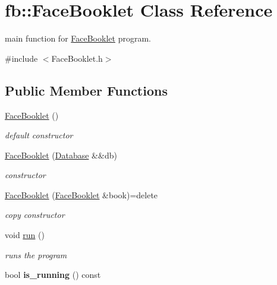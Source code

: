 \hypertarget{classfb_1_1_face_booklet}{\section{fb\+:\+:Face\+Booklet Class Reference}
\label{classfb_1_1_face_booklet}
}


main function for \hyperlink{classfb_1_1_face_booklet}{Face\+Booklet} program.  




{\ttfamily \#include $<$Face\+Booklet.\+h$>$}

\subsection*{Public Member Functions}
\begin{DoxyCompactItemize}
\item 
\hypertarget{classfb_1_1_face_booklet_ab8c98ceebb70c063a3f2f26247fddfdf}{\hyperlink{classfb_1_1_face_booklet_ab8c98ceebb70c063a3f2f26247fddfdf}{Face\+Booklet} ()}\label{classfb_1_1_face_booklet_ab8c98ceebb70c063a3f2f26247fddfdf}

\begin{DoxyCompactList}\small\item\em default constructor \end{DoxyCompactList}\item 
\hyperlink{classfb_1_1_face_booklet_a2a3a9acd18e96c53a7d2cb1ce83dd092}{Face\+Booklet} (\hyperlink{classfb_1_1_database}{Database} \&\&db)
\begin{DoxyCompactList}\small\item\em constructor \end{DoxyCompactList}\item 
\hypertarget{classfb_1_1_face_booklet_a39051b85601de9be1ab3467bfe2dc5bb}{\hyperlink{classfb_1_1_face_booklet_a39051b85601de9be1ab3467bfe2dc5bb}{Face\+Booklet} (\hyperlink{classfb_1_1_face_booklet}{Face\+Booklet} \&book)=delete}\label{classfb_1_1_face_booklet_a39051b85601de9be1ab3467bfe2dc5bb}

\begin{DoxyCompactList}\small\item\em copy constructor \end{DoxyCompactList}\item 
void \hyperlink{classfb_1_1_face_booklet_a59e4c9ecf6767a14f9b79d4f6cfa2c6d}{run} ()
\begin{DoxyCompactList}\small\item\em runs the program \end{DoxyCompactList}\item 
\hypertarget{classfb_1_1_face_booklet_a9fa6d758f13783c1b6f1cfc36f4ef3dd}{bool {\bfseries is\+\_\+running} () const }\label{classfb_1_1_face_booklet_a9fa6d758f13783c1b6f1cfc36f4ef3dd}


\end{DoxyCompactItemize}

